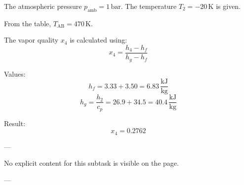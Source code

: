 The atmospheric pressure \( p_{\text{amb}} = 1 \, \text{bar} \).  
The temperature \( T_2 = -20 \, \text{K} \) is given.  

From the table, \( T_{\text{AB}} = 470 \, \text{K} \).  

The vapor quality \( x_4 \) is calculated using:  
\[
x_4 = \frac{h_4 - h_f}{h_g - h_f}
\]  

Values:  
\[
h_f = 3.33 + 3.50 = 6.83 \, \frac{\text{kJ}}{\text{kg}}
\]  
\[
h_g = \frac{h_2}{c_p} = 26.9 + 34.5 = 40.4 \, \frac{\text{kJ}}{\text{kg}}
\]  

Result:  
\[
x_4 = 0.2762
\]  

---

No explicit content for this subtask is visible on the page.  

---